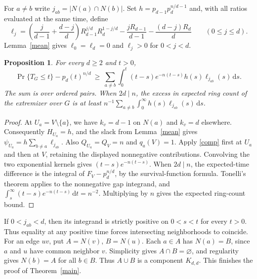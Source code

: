 \documentclass[11pt,a4paper]{article}
\newtheorem{proposition}[theorem]{Proposition}
\theoremstyle{remark}
\newcommand{\dd}{\,\mathrm d}
\begin{document}
For \(a\ne b\) write \(j_{ab}=|N(a)\cap N(b)|\). Set \(h=p_{d-1}p_d^{n/d-1}\) and, with all ratios evaluated at the same time, define
\[
 \ell_j=\left(\frac j{d-1}+\frac{d-j}{d}\right)
          R_{d-1}^{j/d}R_d^{1-j/d}
          -\frac{jR_{d-1}}{d-1}-\frac{(d-j)R_d}{d}
 \qquad(0\le j\le d).
\]
Lemma~\ref{mean} gives \(\ell_0=\ell_d=0\) and \(\ell_j>0\) for \(0<j<d\).

\begin{proposition}\label{gap}
For every \(d\ge2\) and \(t>0\),
\[
 \Pr\{T_G\le t\}-p_d(t)^{n/d}
 \ \ge\ \sum_{a\ne b}\int_0^t (t-s)e^{-n(t-s)}h(s)\ell_{j_{ab}}(s)\dd s .
\]
The sum is over ordered pairs. When \(2d\mid n\), the excess in expected ring count of the extremizer over \(G\) is at least
\(n^{-1}\sum_{a\ne b}\int_0^\infty h(s)\ell_{j_{ab}}(s)\dd s\).
\end{proposition}
\begin{proof}
At \(U_a=V\setminus\{a\}\), we have \(k_v=d-1\) on \(N(a)\) and \(k_v=d\) elsewhere. Consequently \(H_{U_a}=h\), and the slack from Lemma~\ref{mean} gives \(\psi_{U_a}=h\sum_{b\ne a}\ell_{j_{ab}}\). Also \(Q_{U_a}=Q_V=n\) and \(q_a(V)=1\). Apply \eqref{comp} first at \(U_a\) and then at \(V\), retaining the displayed nonnegative contributions. Convolving the two exponential kernels gives \((t-s)e^{-n(t-s)}\). When \(2d\mid n\), the expected-time difference is the integral of \(F_V-p_d^{n/d}\), by the survival-function formula. Tonelli's theorem applies to the nonnegative gap integrand, and \(\int_s^\infty(t-s)e^{-n(t-s)}\dd t=n^{-2}\). Multiplying by \(n\) gives the expected ring-count bound.
\end{proof}

If \(0<j_{ab}<d\), then its integrand is strictly positive on \(0<s<t\) for every \(t>0\). Thus equality at any positive time forces intersecting neighborhoods to coincide. For an edge \(uv\), put \(A=N(v)\), \(B=N(u)\). Each \(a\in A\) has \(N(a)=B\), since \(a\) and \(u\) have common neighbor \(v\). Simplicity gives \(A\cap B=\varnothing\), and regularity gives \(N(b)=A\) for all \(b\in B\). Thus \(A\cup B\) is a component \(K_{d,d}\). This finishes the proof of Theorem~\ref{main}.
\end{document}
